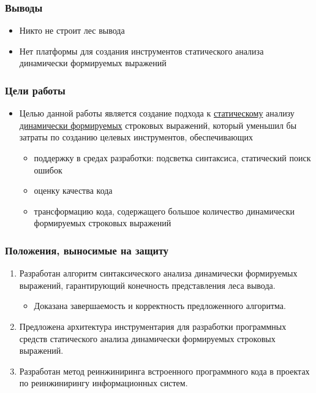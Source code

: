 \documentclass{beamer}
\begin{document}
\begin{frame}
    \transwipe[direction=90]
    \frametitle{Выводы}
    \begin{itemize}
        \item Никто не строит лес вывода
        \item Нет платформы для создания инструментов статического анализа динамически формируемых 
        выражений
    \end{itemize}
\end{frame}

\begin{frame}
    \transwipe[direction=90]
    \frametitle{Цели работы}
    \begin{itemize}
        \item Целью данной работы является создание подхода к \underline{статическому} анализу \underline{динамически формируемых} строковых выражений, 
        который уменьшил бы затраты по созданию целевых инструментов, обеспечивающих 
        \begin{itemize}
            \item поддержку в средах разработки: подсветка синтаксиса, статический поиск ошибок
            \item оценку качества кода
            \item трансформацию кода, содержащего большое количество динамически формируемых строковых 
        выражений
        \end{itemize}
    \end{itemize}
\end{frame}

\begin{frame}
    \transwipe[direction=90]
    \frametitle{Положения, выносимые на защиту}
    \begin{enumerate}
        \item Разработан алгоритм синтаксического анализа динамически формируемых выражений, гарантирующий конечность представления леса вывода. 
        \begin{itemize}
            \item Доказана завершаемость и корректность предложенного алгоритма.
        \end{itemize}
        \item Предложена архитектура инструментария для разработки программных средств статического анализа динамически формируемых строковых выражений.
        \item Разработан метод реинжиниринга встроенного программного кода в проектах по реинжинирингу информационных систем. 
    \end{enumerate}
\end{frame}
\end{document}
